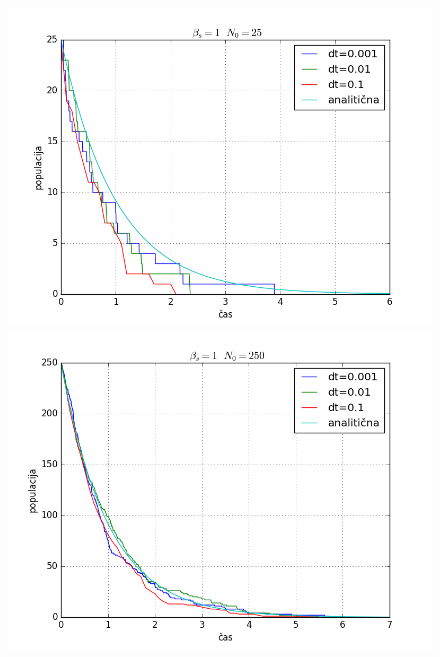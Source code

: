 \documentclass[slovene,11pt,a4paper]{article}
\numberwithin{equation}{section} %
\numberwithin{figure}{section} %
\numberwithin{table}{section} %
\begin{document}
\begin{figure}[h]
\centering
\begin{minipage}{0.5\textwidth}
\centering
\includegraphics[scale=0.45]{slike/populacija_umiranje_preprosto_25.png}
\end{minipage}\hfill
\begin{minipage}{0.5\textwidth}
\centering
\includegraphics[scale=0.45]{slike/populacija_umiranje_preprosto_250.png}
\end{minipage}
\begin{minipage}{0.5\textwidth}
\centering

\end{minipage}
\end{figure}
\end{document}
